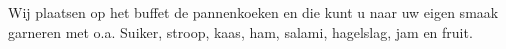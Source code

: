 Wij plaatsen op het buffet de pannenkoeken en die kunt u
naar uw eigen smaak garneren met o.a.
Suiker, stroop, kaas, ham, salami, hagelslag, jam en fruit.
